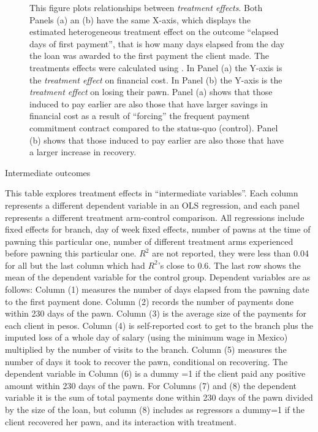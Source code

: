 \documentclass[11pt]{article}
\begin{document}
\begin{figure}[H]
\begin{center}
    \end{center}
       \scriptsize 
       This figure plots relationships between \textit{treatment effects}. Both Panels (a) an (b) have the same X-axis, which displays the estimated heterogeneous treatment effect on the outcome ``elapsed days of first payment'', that is how many days elapsed from the day the loan was awarded to the first payment the client made. The treatments effects were calculated using \cite{atheygrf}. In Panel (a) the Y-axis is the \textit{treatment effect} on financial cost. In Panel (b) the Y-axis is the \textit{treatment effect} on losing their pawn. Panel (a) shows that those induced to pay earlier are also those that have larger savings in financial cost as a result of ``forcing'' the frequent payment commitment contract compared to the status-quo (control). Panel (b) shows that those induced to pay earlier are also those that have a larger increase in recovery.
\end{figure}


\newpage

\begin{table}[H]
\caption{Intermediate outcomes}
\label{mechanisms}
\begin{center}
\scriptsize{}
\end{center}
 \scriptsize
This table explores treatment effects in ``intermediate variables''. Each column represents a different dependent variable in an OLS regression, and each panel represents a different treatment arm-control comparison. All regressions include fixed effects for branch, day of week fixed effects, number of pawns at the time of pawning this particular one, number of different treatment arms experienced before pawning this particular one. $R^2$ are not reported, they were less than 0.04 for all but the last column which had $R^2$'s close to 0.6. The last row shows the mean of the dependent variable for the control group. Dependent variables are as follows: Column (1) measures the number of days elapsed from the pawning date to the first payment done. Column (2) records the number of payments done within 230 days of the pawn. Column (3) is the average size of the payments for each client in pesos. Column (4) is self-reported cost to get to the branch plus the imputed loss of a whole day of salary (using the minimum wage in Mexico) multiplied by the number of visits to the branch. Column (5) measures the number of days it took to recover the pawn, conditional on recovering. The dependent variable in Column (6) is a dummy =1 if the client paid any positive amount within 230 days of the pawn. For Columns (7) and (8) the dependent variable it is the sum of total payments done within 230 days of the pawn divided by the size of the loan, but column (8) includes as regressors a dummy=1 if the client recovered her pawn, and its interaction with treatment.

\end{table}
\end{document}
